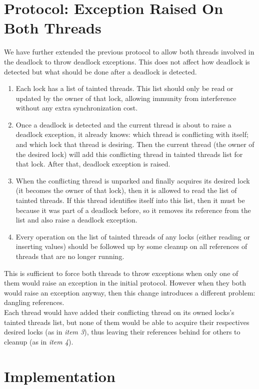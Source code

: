 \section{Protocol: Exception Raised On Both Threads}
We have further extended the previous protocol to allow both threads involved in the deadlock to throw deadlock exceptions. This does not affect how deadlock is detected but what should be done after a deadlock is detected.
\begin{enumerate}
\item Each lock has a list of tainted threads. This list should only be read or updated by the owner of that lock, allowing immunity from interference without any extra synchronization cost.
\item Once a deadlock is detected and the current thread is about to raise a deadlock exception, it already knows: which thread is conflicting with itself; and which lock that thread is desiring. Then the current thread (the owner of the desired lock) will add this conflicting thread in tainted threads list for that lock. After that, deadlock exception is raised.
\item When the conflicting thread is unparked and finally acquires its desired lock (it becomes the owner of that lock), then it is allowed to read the list of tainted threads. If this thread identifies itself into this list, then it must be because it was part of a deadlock before, so it removes its reference from the list and also raise a deadlock exception.
\item Every operation on the list of tainted threads of any locks (either reading or inserting values) should be followed up by some cleanup on all references of threads that are no longer running.
\end{enumerate}

This is sufficient to force both threads to throw exceptions when only one of them would raise an exception in the initial protocol.
However when they both would raise an exception anyway, then this change introduces a different problem: dangling references.\\
Each thread would have added their conflicting thread on its owned locks's tainted threads list,
but none of them would be able to acquire their respectives desired locks (as in \emph{item 3}),
thus leaving their references behind for others to cleanup (as in \emph{item 4}). 

\section{Implementation}

